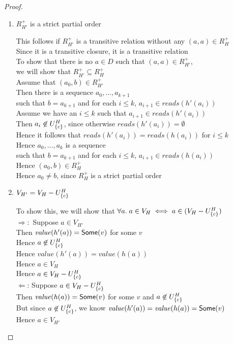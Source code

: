 \begin{proof}
\begin{enumerate}
\item $R^+_{H'}$ is a strict partial order 
  \begin{tabbedproof}
    \oo This follows if $R^+_{H'}$ is a transitive relation without any $(a,a) \in R^+_H$ \\
    \oo Since it is a transitive closure, it is a transitive relation \\
    \oo To show that there is no $a \in D$ such that $(a,a) \in R^+_{H'}$, \\
    \ox we will show that $R^+_{H'} \subseteq R^+_H$ \\
    \oo Assume that $(a_0,b) \in R^+_{H'}$ \\
    \oo Then there is a sequence $a_0, \ldots, a_{k+1}$ \\
    \ooo such that $b = a_{k+1}$ and for each $i \leq k$, $a_{i+1} \in \mathit{reads}(h'(a_i))$ \\
    \oo Assume we have an $i \leq k$ such that $a_{i+1} \in \mathit{reads}(h'(a_i))$ \\
    \ooo Then $a_i \not\in U^H_{\{{c}\}}$, since otherwise $\mathit{reads}(h'(a_i)) = \emptyset$ \\
    \oo Hence it follows that $\mathit{reads}(h'(a_i)) = \mathit{reads}(h(a_i))$ for $i \leq k$ \\
    \oo Hence $a_0, \ldots, a_k$ is a sequence \\ 
    \ooo such that $b = a_{k+1}$ and for each $i \leq k$, $a_{i+1} \in \mathit{reads}(h(a_i))$ \\
    \oo Hence $(a_0, b) \in R^+_H$ \\
    \oo Hence $a_0 \not= b$, since $R^+_H$ is a strict partial order 
  \end{tabbedproof}

\item $V_{H'} = V_H - U^H_{\{{c}\}}$
  \begin{tabbedproof}
    \oo To show this, we will show that $\forall a.\;a \in V_H \iff a \in (V_H - U^H_{\{{c}\}})$ \\
    \oo $\Rightarrow:$  Suppose $a \in V_{H'}$ \\
    \ooo Then $\mathit{value}(h'(a)) = \mathsf{Some}(v)$ for some $v$ \\
    \ooo Hence $a \not\in U^H_{\{{c}\}}$ \\
    \ooo Hence $\mathit{value}(h'(a)) = \mathit{value}(h(a))$  \\
    \ooo Hence $a \in V_H$ \\
    \ooo Hence $a \in V_{H} - U^H_{\{{c}\}}$ \\
    \oo $\Leftarrow$: Suppose $a \in V_{H} - U^H_{\{{c}\}}$ \\
    \ooo Then $\mathit{value}(h(a)) = \mathsf{Some}(v)$ for some $v$ and $a \not\in U^H_{\{{c}\}}$ \\
    \ooo But since $a \not\in U^H_{\{{c}\}}$, we know $\mathit{value}(h'(a)) = \mathit{value}(h(a)) = \mathsf{Some}(v)$ \\
    \ooo Hence $a \in V_{H'}$ 
  \end{tabbedproof}


\end{enumerate}
\end{proof}
